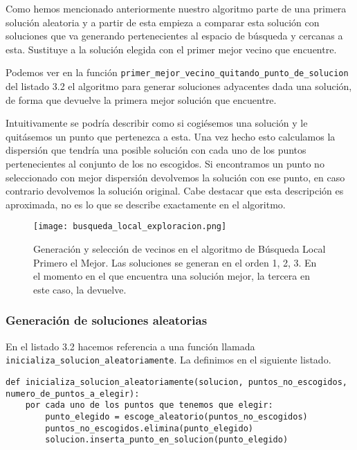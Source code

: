 Como hemos mencionado anteriormente nuestro algoritmo parte de una primera solución aleatoria y a partir de esta empieza
a comparar esta solución con soluciones que va generando pertenecientes al espacio de búsqueda y cercanas a esta. Sustituye
a la solución elegida con el primer mejor vecino que encuentre.

Podemos ver en la función \texttt{primer\_mejor\_vecino\_quitando\_punto\_de\_solucion} del listado 3.2 el algoritmo
para generar soluciones adyacentes dada una solución, de forma que devuelve la primera mejor solución que encuentre.

Intuitivamente se podría describir como si cogiésemos una solución y le quitásemos un punto que pertenezca a esta.
Una vez hecho esto calculamos la dispersión que tendría una posible solución con cada uno de los puntos pertenecientes
al conjunto de los no escogidos. Si encontramos un punto no seleccionado con mejor dispersión devolvemos la solución
con ese punto, en caso contrario devolvemos la solución original. Cabe destacar que esta descripción es aproximada,
no es lo que se describe exactamente en el algoritmo.

\begin{figure}[ht]
    \centering
    \texttt{[image: busqueda\_local\_exploracion.png]}
    \caption{Generación y selección de vecinos en el algoritmo de Búsqueda Local Primero el Mejor. Las soluciones se generan en el orden 1, 2, 3. En el momento en el que encuentra una solución mejor, la tercera en este caso, la devuelve.}
\end{figure}

\subsubsection{Generación de soluciones aleatorias}

En el listado 3.2 hacemos referencia a una función llamada \texttt{inicializa\_solucion\_aleatoriamente}.
La definimos en el siguiente listado.

\begin{minipage}{\textwidth}
\begin{lstlisting}[mathescape=true,caption={Definición de la función \texttt{inicializa\_solucion\_aleatoriamente} para generar una solución consistente en elementos aleatorios.},captionpos=b]
def inicializa_solucion_aleatoriamente(solucion, puntos_no_escogidos, numero_de_puntos_a_elegir):
    por cada uno de los puntos que tenemos que elegir:
        punto_elegido = escoge_aleatorio(puntos_no_escogidos)
        puntos_no_escogidos.elimina(punto_elegido)
        solucion.inserta_punto_en_solucion(punto_elegido)
\end{lstlisting}
\end{minipage}